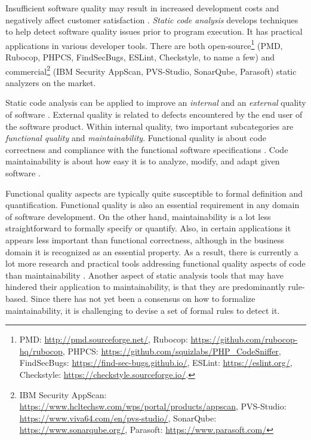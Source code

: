 
Insufficient software quality may result in increased development costs and
negatively affect customer satisfaction \citep{The_Economics_of_Software_Quality}.
\textit{Static code analysis} develops techniques to help detect software quality
issues prior to program execution. It has practical applications in various developer tools. There are both open-source\footnote{PMD: \url{http://pmd.sourceforge.net/}, Rubocop: \url{https://github.com/rubocop-hq/rubocop},
PHPCS: \url{https://github.com/squizlabs/PHP_CodeSniffer},
FindSecBugs: \url{https://find-sec-bugs.github.io/}, ESLint: \url{https://eslint.org/}, Checkstyle: \url{https://checkstyle.sourceforge.io/}.}
(PMD, Rubocop, PHPCS, FindSecBugs, ESLint, Checkstyle, to name a few) and commercial\footnote{IBM Security AppScan: \url{https://www.hcltechsw.com/wps/portal/products/appscan},
PVS-Studio: \url{https://www.viva64.com/en/pvs-studio/},
SonarQube: \url{https://www.sonarqube.org/},
Parasoft: \url{https://www.parasoft.com/}}
(IBM Security AppScan, PVS-Studio, SonarQube, Parasoft) static analyzers
on the market.

Static code analysis can be applied to improve an \textit{internal} and an
\textit{external} quality of software \citep{Ilyas2016StaticCA}. External
quality is related to defects encountered by the end user of the software
product. Within internal quality, two important subcategories are
\textit{functional quality} and \textit{maintainability}. Functional quality is
about code correctness and compliance with the functional software
specifications \citep{Farhan}. Code maintainability is about how easy it is to
analyze, modify, and adapt given software \citep{Mohammadi2013AnAO}.

Functional quality aspects are typically quite susceptible to formal definition
and quantification.
Functional quality is also an essential
requirement in any domain of software development. On the other hand,
maintainability is a lot less straightforward to formally specify or quantify.
Also, in certain applications it appears less important than
functional correctness, although in the business domain it is recognized as an
essential property.
As a result, there is currently a lot more
research and practical tools addressing functional quality aspects of code than
maintainability \citep{Overview_Static_Code_Analysis_in_Software_Development}.
Another aspect of static analysis tools that may have hindered their application
to maintainability, is that they are predominantly rule-based. Since there has
not yet been a consensus on how to formalize maintainability, it is challenging
to devise a set of formal rules to detect it.

